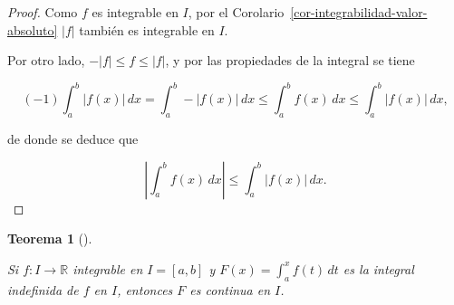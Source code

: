 \documentclass[
  a4paper,
]{scrreport}
\theoremstyle{definition}
\theoremstyle{plain}
\theoremstyle{definition}
\theoremstyle{definition}
\theoremstyle{plain}
\newtheorem{theorem}{Teorema}[chapter]
\theoremstyle{plain}
\theoremstyle{remark}
\begin{document}
\begin{tcolorbox}[enhanced jigsaw, leftrule=.75mm, colbacktitle=quarto-callout-note-color!10!white, toprule=.15mm, opacityback=0, opacitybacktitle=0.6, toptitle=1mm, breakable, bottomtitle=1mm, colframe=quarto-callout-note-color-frame, rightrule=.15mm, titlerule=0mm, title=\textcolor{quarto-callout-note-color}{\faInfo}\hspace{0.5em}{Demostración}, arc=.35mm, left=2mm, bottomrule=.15mm, colback=white, coltitle=black]

\begin{proof}
Como \(f\) es integrable en \(I\), por el
Corolario~\ref{cor-integrabilidad-valor-absoluto} \(|f|\) también es
integrable en \(I\).

Por otro lado, \(-|f|\leq f \leq |f|\), y por las propiedades de la
integral se tiene

\[
(-1)\int_a^b |f(x)|\,dx = \int_a^b -|f(x)|\,dx \leq \int_a^b f(x)\,dx \leq \int_a^b |f(x)|\,dx,
\]

de donde se deduce que

\[
\left|\int_a^b f(x)\,dx\right| \leq \int_a^b |f(x)|\,dx.
\]
\end{proof}

\end{tcolorbox}

\begin{theorem}[]\protect\hypertarget{thm-integral-indefinida-continua}{}\label{thm-integral-indefinida-continua}

Si \(f:I\to\mathbb{R}\) integrable en \(I=[a,b]\) y
\(F(x)=\int_a^x f(t)\,dt\) es la integral indefinida de \(f\) en \(I\),
entonces \(F\) es continua en \(I\).

\end{theorem}
\end{document}
